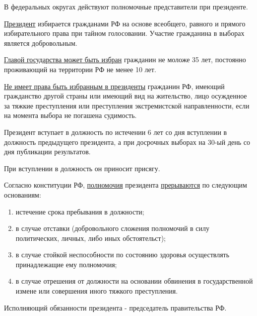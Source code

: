 \documentclass[a5paper,10pt]{article}
\begin{document}
			В федеральных округах действуют полномочные представители при президенте.

			\underline{Президент} избирается гражданами РФ на основе всеобщего, равного и прямого избирательного права при тайном голосовании. Участие гражданина в выборах является добровольным.

			\underline{Главой государства может быть избран} гражданин не моложе 35 лет, постоянно проживающий на территории РФ не менее 10 лет.

			\underline{Не имеет права быть избранным в президенты} гражданин РФ, имеющий гражданство другой страны или имеющий вид на жительство, лицо осужденное за тяжкие преступления или преступления экстремистской направленности, если на момента выбора не погашена судимость.

			Президент вступает в должность по истечении 6 лет со дня вступлении в должность предыдущего президента, а при досрочных выборах на 30-ый день со дня публикации результатов.

			При вступлении в должность он приносит присягу.

			Согласно конституции РФ, \underline{полномочия} президента \underline{прерываются} по следующим основаниям:
			\begin{enumerate}
				\item истечение срока пребывания в должности;
				\item в случае отставки (добровольного сложения полномочий в силу политических, личных, либо иных обстоятельст);
				\item в случае стойкой неспособности по состоянию здоровья осуществлять принадлежащие ему полномочия;
				\item в случае отрешения от должности на основании обвинения в государственной измене или совершения иного тяжкого преступления.
			\end{enumerate}

			Исполняющий обязанности президента - председатель правительства РФ.
\end{document}
